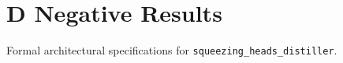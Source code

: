 \section{D Negative Results}

Formal architectural specifications for \texttt{squeezing_heads_distiller}.
